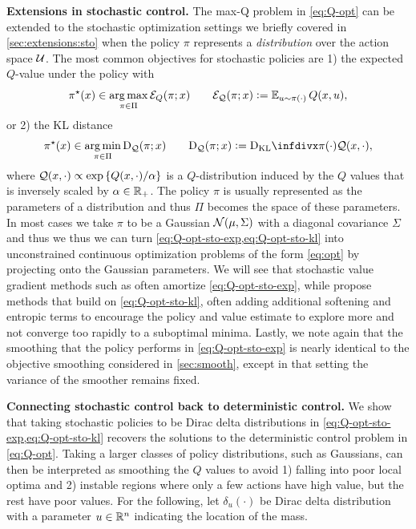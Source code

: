 \documentclass[twoside,11pt]{article}
\begin{document}
\textbf{Extensions in stochastic control.}
The max-Q problem in \cref{eq:Q-opt} can be extended to the
stochastic optimization settings we briefly covered in
\cref{sec:extensions:sto} when the policy $\pi$
represents a \emph{distribution} over the action space ${\mathcal{U}}$.
The most common objectives for stochastic policies are
1) the expected $Q$-value under the policy with
\begin{equation}
  \pi^\star(x) \in \operatorname*{arg\,max}_{\pi\in\Pi} {\mathcal{E}}_Q(\pi; x) \qquad {\mathcal{E}}_{\mathcal{Q}}(\pi; x)\vcentcolon= \operatorname{\mathbb{E}}_{u\sim\pi(\cdot)} Q(x,u),
  \label{eq:Q-opt-sto-exp}
\end{equation}
or 2) the KL distance
\begin{equation}
  \pi^\star(x) \in \argmin_{\pi\in\Pi} \D_\gQ(\pi; x) \qquad \D_\gQ(\pi; x)\defeq \kl{\pi(\cdot)}{\gQ(x, \cdot)},
  \label{eq:Q-opt-sto-kl}
\end{equation}
where ${\mathcal{Q}}(x, \cdot)\propto \exp\left\{Q(x, \cdot)/\alpha\right\}$
is a $Q$-distribution induced by the $Q$ values that is
inversely scaled by $\alpha\in\mathbb{R}_+$.
The policy $\pi$ is usually represented as the parameters of a distribution
and thus $\Pi$ becomes the space of these parameters.
In most cases we take $\pi$ to be a Gaussian ${\mathcal{N}}(\mu, \Sigma)$
with a diagonal covariance $\Sigma$ and thus we thus we can
turn \cref{eq:Q-opt-sto-exp,eq:Q-opt-sto-kl} into unconstrained continuous
optimization problems of the form \cref{eq:opt} by
projecting onto the Gaussian parameters.
We will see that stochastic value gradient methods such as \citet{heess2015learning}
often amortize \cref{eq:Q-opt-sto-exp}, while
\citet{levine2013guided,haarnoja2018soft} propose methods
that build on \cref{eq:Q-opt-sto-kl}, often adding additional
softening and entropic terms to encourage the policy
and value estimate to explore more and not converge too
rapidly to a suboptimal minima.
Lastly, we note again that the smoothing that the policy performs in
\cref{eq:Q-opt-sto-exp} is nearly identical to the objective
smoothing considered in \cref{sec:smooth}, except in that setting
the variance of the smoother remains fixed.

\textbf{Connecting stochastic control back to deterministic control.}
We show that taking stochastic policies to be Dirac delta distributions
in \cref{eq:Q-opt-sto-exp,eq:Q-opt-sto-kl} recovers the solutions to the
deterministic control problem in \cref{eq:Q-opt}.
Taking a larger classes of policy distributions, such as
Gaussians, can then be interpreted as smoothing the $Q$
values to avoid 1) falling into poor local optima and
2) instable regions where only a few actions have
high value, but the rest have poor values.
For the following, let $\delta_u(\cdot)$ be Dirac delta
distribution with a parameter $u\in\mathbb{R}^n$ indicating the
location of the mass.
\end{document}
